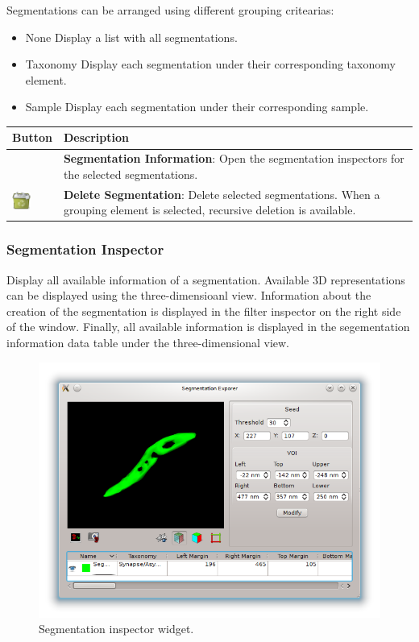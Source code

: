 Segmentations can be arranged using different grouping critearias:
\begin{itemize}
  \item None Display a list with all segmentations.
  \item Taxonomy Display each segmentation under their corresponding taxonomy
element.
  \item Sample Display each segmentation under their corresponding sample.
\end{itemize}
\vspace{0.3cm}

\begin{tabular}{| m{1.3cm} | m{12cm} |}
\hline
\textbf{Button} & \textbf{Description}\\
\hline
 & %
\textbf{Segmentation Information}: Open the segmentation inspectors for the
selected segmentations.\\
\hline
\includegraphics[width=0.6cm]{../../frontend/rsc/trash-full} &
\textbf{Delete Segmentation}: Delete selected segmentations. When a grouping
element is selected, recursive deletion is available.\\
\hline
\end{tabular}
\vspace{0.3cm}

\subsubsection{Segmentation Inspector}
Display all available information of a segmentation. Available 3D
representations can be displayed using the three-dimensioanl view. Information
about the creation of the segmentation is displayed in the filter inspector on
the right side of the window. Finally, all available information is displayed
in the segementation information data table under the three-dimensional view.

\begin{figure}[H]
\centering
\includegraphics[width=\linewidth]{fig/SegmentationInspector}
\caption{Segmentation inspector widget.}
\end{figure}

